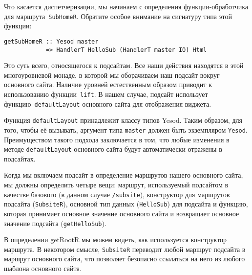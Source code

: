 Что касается диспетчеризации, мы начинаем с определения функции-обработчика для
маршрута~\lstinline'SubHomeR'. Обратите особое внимание на сигнатуру типа этой
функции:
\begin{lstlisting}
getSubHomeR :: Yesod master
            => HandlerT HelloSub (HandlerT master IO) Html
\end{lstlisting}

Это суть всего, относящегося к подсайтам. Все наши действия находятся в этой
многоуровневой монаде, в которой мы оборачиваем наш подсайт вокруг основного
сайта. Наличие уровней естественным образом приводит к использованию
функции~\lstinline'lift'. В нашем случае, подсайт использует
функцию~\lstinline'defaultLayout' основного сайта для отображения виджета.

Функция \lstinline!defaultLayout! принадлежит классу типов Yesod. Таким
образом, для того, чтобы её вызывать, аргумент типа \lstinline!master! должен
быть экземпляром \lstinline!Yesod!.  Преимуществом такого подхода заключается в
том, что любые изменения в методе \lstinline!defaultLayout! основного сайта
будут автоматически отражены в подсайтах.

Когда мы включаем подсайт в определение маршрутов нашего основного сайта, мы
должны определить четыре вещи: маршрут, используемый подсайтом в качестве
базового (в данном случае \lstinline!/subsite!), конструктор для маршрутов
подсайта (\lstinline!SubsiteR!), основной тип данных (\lstinline!HelloSub!) для
подсайта и функцию, которая принимает основное значение основного сайта и
возвращает основное значение подсайта (\lstinline!getHelloSub!).

В определении getRootR мы можем видеть, как используется конструктор маршрута.
В некотором смысле, \lstinline!SubsiteR! переводит любой маршрут подсайта в
маршрут основного сайта, что позволяет безопасно ссылаться на него из любого
шаблона основного сайта.
